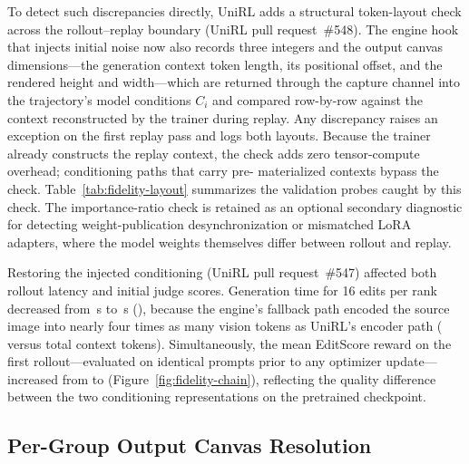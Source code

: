 To detect such discrepancies directly, UniRL adds a structural token-layout check across the rollout--replay boundary (UniRL pull request~\#548).
The engine hook that injects initial noise now also records three integers and the output canvas dimensions---the generation context token length, its positional offset, and the rendered height and width---which are returned through the capture channel into the trajectory's model conditions $C_i$ and compared row-by-row against the context reconstructed by the trainer during replay.
Any discrepancy raises an exception on the first replay pass and logs both layouts.
Because the trainer already constructs the replay context, the check adds zero tensor-compute overhead; conditioning paths that carry pre- materialized contexts bypass the check.
Table~\ref{tab:fidelity-layout} summarizes the validation probes caught by this check.
The importance-ratio check is retained as an optional secondary diagnostic for detecting weight-publication desynchronization or mismatched LoRA adapters, where the model weights themselves differ between rollout and replay.

\begin{table}[H]
\caption{Validation probes for the structural token-layout check across text-to-image (\texttt{t2i}) and image-to-image editing (\texttt{it2i}) paths. ``Engine'' and ``Trainer'' columns report the generation-context token counts on each side. The final column reports the maximum first-update importance-ratio deviation $|\rho-1|$ in the same run.}
\label{tab:fidelity-layout}
\centering
\small

\end{table}

Restoring the injected conditioning (UniRL pull request~\#547) affected both rollout latency and initial judge scores.
Generation time for 16 edits per rank decreased from \RFMainGenerate{}\,s to \RFFixGenerate{}\,s (\RFFixSaving{}), because the engine's fallback path encoded the source image into nearly four times as many vision tokens as UniRL's encoder path (\RFWorkerKv{} versus \RFTrainerKv{} total context tokens).
Simultaneously, the mean EditScore reward on the first rollout---evaluated on identical prompts prior to any optimizer update---increased from \RFMainReward{} to \RFFixReward{} (Figure~\ref{fig:fidelity-chain}), reflecting the quality difference between the two conditioning representations on the pretrained checkpoint.

\subsection{Per-Group Output Canvas Resolution}
\label{sec:fidelity-canvas}

